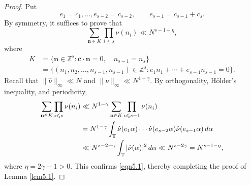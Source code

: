 \documentclass[10pt,a4paper]{amsart}
\def\alp{{\alpha}} \def\bfalp{{\boldsymbol \alpha}}
\def \bT {\mathbb T}
\def \bZ {\mathbb Z}
\def \bc {\mathbf c}
\def \bn {{\mathbf{n}}}
\def\d{{\,{\rm d}}}
\def\gam{{\gamma}} \def\Gam{{\Gamma}}
\def\le{\leqslant} \def\ge{\geqslant} \def\pleq{\preccurlyeq} \def\ple{\prec}
\begin{document}
\begin{proof} Put
\[
e_1 = c_1, \ldots, e_{s-2} = c_{s-2}, \qquad
e_{s-1} = c_{s-1} + c_s.
\]
By symmetry, it suffices to prove that
\begin{equation}
\label{eqn5.1}
\sum_{\bn \in K} \prod_{i \le s} \nu(n_i) \ll N^{s-1-\eta},
\end{equation}
where
\begin{align*}
K &= \{ \bn \in \bZ^s: \bc \cdot \bn = 0, \quad
n_{s-1} = n_s \} \\
&= \{ (n_1, n_2, \ldots, n_{s-1}, n_{s-1}) \in \bZ^s:
e_1 n_1 + \cdots + e_{s-1} n_{s-1} = 0 \}.
\end{align*}
Recall that $\| \hat \nu \|_\infty \ll N$ and $\| \nu \|_\infty \ll N^{1-\gam}$. By orthogonality,  H\"older's inequality, and periodicity,
\begin{align*}
\sum_{\bn \in K} \prod_{i \le s} \nu(n_i) &\ll N^{1-\gam}
\sum_{\bn \in K} \prod_{i \le s - 1} \nu(n_i) \\
&= N^{1-\gam}
\int_\bT \hat \nu(e_1 \alp) \cdots \hat \nu(e_{s-2}\alp) \hat \nu (e_{s-1} \alp) \d \alp \\
&\ll N^{s-2-\gam} \int_\bT |\hat 
\nu(\alp)|^2 \d \alp \ll N^{s - 2 \gam} = N^{s - 1 - \eta},
\end{align*}
where $\eta = 2\gam - 1 > 0$. This confirms \eqref{eqn5.1}, thereby completing the proof of Lemma \ref{lem5.1}.
\end{proof}
\end{document}
